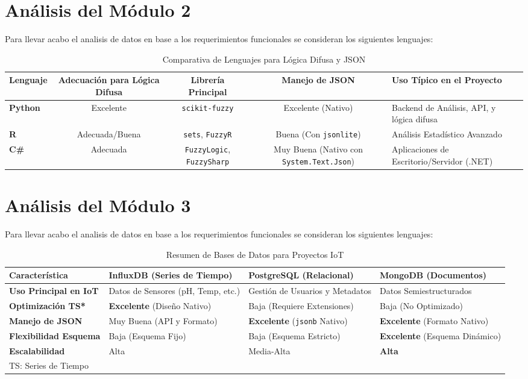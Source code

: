 \section{Análisis del Módulo 2}
Para llevar acabo el analisis de datos en base a los requerimientos funcionales se 
consideran los siguientes lenguajes:
\begin{table}[h]
    \centering
    \caption{Comparativa de Lenguajes para Lógica Difusa y JSON}
    \label{tab:lenguajes_fuzzy}
    \begin{tabular}{|l|c|c|c|l|}
        \hline
        \textbf{Lenguaje} & \textbf{Adecuación para Lógica Difusa} & \textbf{Librería Principal} & \textbf{Manejo de JSON} & \textbf{Uso Típico en el Proyecto} \\
        \hline
        \textbf{Python} & Excelente & \texttt{scikit-fuzzy} & Excelente (Nativo) & Backend de Análisis, API, y lógica difusa \\
        \hline
        \textbf{R} & Adecuada/Buena & \texttt{sets}, \texttt{FuzzyR} & Buena (Con \texttt{jsonlite}) & Análisis Estadístico Avanzado \\
        \hline
        \textbf{C\#} & Adecuada & \texttt{FuzzyLogic}, \texttt{FuzzySharp} & Muy Buena (Nativo con \texttt{System.Text.Json}) & Aplicaciones de Escritorio/Servidor (.NET) \\
        \hline
    \end{tabular}
\end{table}
\section{Análisis del Módulo 3}
Para llevar acabo el analisis de datos en base a los requerimientos funcionales se 
consideran los siguientes lenguajes:
\begin{table}[h]
    \centering
    \caption{Resumen de Bases de Datos para Proyectos IoT}
    \label{tab:bd_resumen}
    \begin{tabular}{|l|l|l|l|}
        \hline
        \textbf{Característica} & \textbf{InfluxDB (Series de Tiempo)} & \textbf{PostgreSQL (Relacional)} & \textbf{MongoDB (Documentos)} \\
        \hline
        \textbf{Uso Principal en IoT} & Datos de Sensores (pH, Temp, etc.) & Gestión de Usuarios y Metadatos & Datos Semiestructurados \\
        \hline
        \textbf{Optimización TS*} & \textbf{Excelente} (Diseño Nativo) & Baja (Requiere Extensiones) & Baja (No Optimizado) \\
        \hline
        \textbf{Manejo de JSON} & Muy Buena (API y Formato) & \textbf{Excelente} (\texttt{jsonb} Nativo) & \textbf{Excelente} (Formato Nativo) \\
        \hline
        \textbf{Flexibilidad Esquema} & Baja (Esquema Fijo) & Baja (Esquema Estricto) & \textbf{Excelente} (Esquema Dinámico) \\
        \hline
        \textbf{Escalabilidad} & Alta & Media-Alta & \textbf{Alta} \\
        \hline
        \multicolumn{4}{l}{\small *TS: Series de Tiempo} \\
    \end{tabular}
\end{table}

